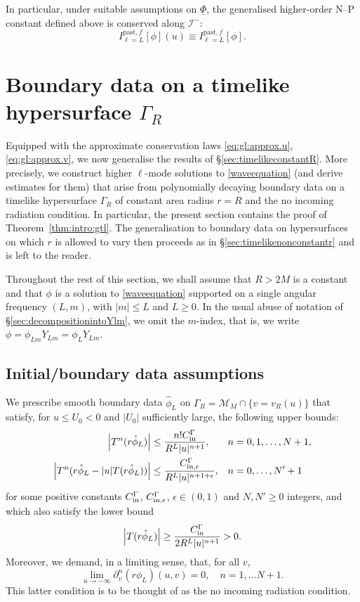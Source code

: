 \documentclass[11pt,english]{article}
\numberwithin{equation}{section}
\theoremstyle{remark}
\theoremstyle{plain}
\theoremstyle{remark}
\newcommand{\pv}{\partial_v}
\renewcommand{\(}{\left(}
\renewcommand{\)}{\right)}
\newcommand{\ILp}[1]{I_{\ell=#1}^{\mathrm{past},f}}
\begin{document}
In particular, under suitable assumptions on $\underline{\Phi}$, the generalised higher-order N--P constant defined above is conserved along $\mathcal{I}^-$:
\begin{equation}
 \ILp{L}[\phi](u) \equiv \ILp{L}[\phi] .
\end{equation}

\section{Boundary data on a timelike hypersurface \texorpdfstring{$\Gamma_R$}{Gamma-R}}\label{sec:general:timelike}
Equipped with the approximate conservation laws \eqref{eq:gl:approx.u}, \eqref{eq:gl:approx.v}, we now generalise the results of \S \ref{sec:timelikeconstantR}. More precisely, we construct higher $\ell$-mode solutions to \eqref{waveequation} (and derive estimates for them) that arise from polynomially decaying boundary data on a timelike hypersurface $\Gamma_R$ of constant area radius $r=R$ and the no incoming radiation condition. In particular, the present section contains the proof of Theorem~\ref{thm:intro:gtl}. The generalisation to boundary data on hypersurfaces on which $r$ is allowed to vary then proceeds as in \S\ref{sec:timelikenonconstantr} and is left to the reader.

Throughout the rest of this section, we shall assume that $R>2M$ is a constant and that $\phi$ is a solution to \eqref{waveequation} supported on a single angular frequency $(L,m)$, with $|m|\leq L$ and $L\geq0$. In the usual abuse of notation of \S\ref{sec:decompositionintoYlm}, we omit the $m$-index, that is, we write $\phi=\phi_{Lm}Y_{Lm}=\phi_L Y_{Lm}$.
\subsection{Initial/boundary data assumptions}\label{sec:gtl:ass}
 We prescribe smooth boundary data $\hat{\phi}_L$ on $\Gamma_R=\mathcal{M}_M\cap\{v=v_R(u)\}$ that satisfy, for $u\leq U_0<0$ and $|U_0|$ sufficiently large, the following upper bounds:
\begin{align}\label{eq:gtl:boundarydata1}
\left|T^n(r\hat{\phi}_L)\right|&\leq \frac{n! C_{\mathrm{in}}^\Gamma}{R^L|u|^{n+1}},&&n=0,1,\dots,N+1,\\
\left|T^n(r\hat{\phi}_L-|u|T(r\hat{\phi}_L))\right|&\leq \frac{C_{\mathrm{in},\epsilon}^\Gamma}{R^L|u|^{n+1+\epsilon}},&& n=0,\dots,N'+1\label{eq:gtl:boundarydata2}
\end{align}
for some positive constants $C_{\mathrm{in}}^\Gamma$, $C_{\mathrm{in},\epsilon}^\Gamma$, $\epsilon\in(0,1)$ and $N,N'\geq 0$  integers, and which also satisfy the lower bound
\begin{equation}
\left|T(r\hat{\phi}_L)\right|\geq \frac{C_{\mathrm{in}}^\Gamma}{2R^L|u|^{n+1}}>0.\label{eq:gtl:boundarydata3}
\end{equation}
Moreover, we demand, in a limiting sense, that, for all $v$,
\begin{equation}\label{eq:gtl:noincomingradiation}
\lim_{u\to-\infty}\pv^n(r\phi_L)(u,v)=0,\quad n=1,\dots N+1.
\end{equation} 
This latter condition is to be thought of as the no incoming radiation condition.
\end{document}
